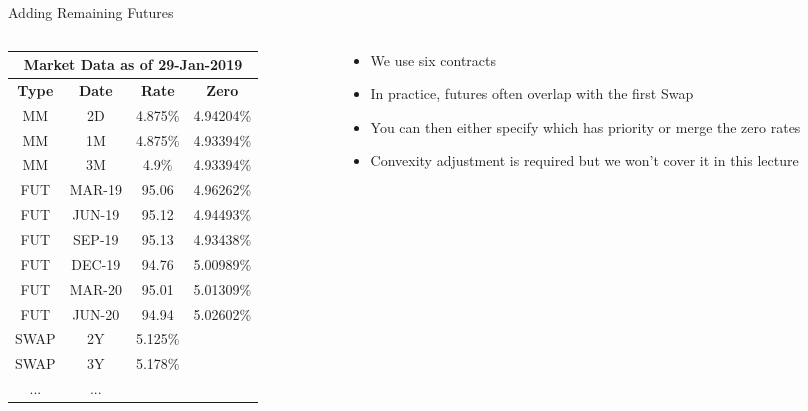 \documentclass[handout, aspectratio=169]{beamer}
\begin{document}
\begin{frame}{Adding Remaining Futures}
	\begin{columns}[T]
		\begin{column}{0.4\textwidth}
			\begin{table}[t]
				\centering
				\begin{adjustbox}{max width=\textwidth, max height=\textheight}
					\begin{tabular}{|c|c|c|c|} 
						\hline
						\multicolumn{4}{|c|}{\textbf{Market Data as of 29-Jan-2019}} \\
						\hline
						\textbf{Type} & \textbf{Date}  & \textbf{Rate} & \textbf{Zero}\\				
						\hline
						MM & 2D & 4.875\% & 4.94204\% \\
						MM & 1M & 4.875\% & 4.93394\% \\
						MM & 3M & 4.9\% & 4.93394\% \\
						\hline
						FUT & MAR-19 & 95.06 & 4.96262\% \\
						FUT & JUN-19 & 95.12 & 4.94493\% \\
						FUT & SEP-19 & 95.13 & 4.93438\% \\
						FUT & DEC-19 & 94.76 & 5.00989\% \\
						FUT & MAR-20 & 95.01 & 5.01309\% \\
						FUT & JUN-20 & 94.94 & 5.02602\% \\
						\hline
						SWAP & 2Y & 5.125\% &\\
						SWAP & 3Y & 5.178\% &\\
						... & ... & &\\
						\hline
					\end{tabular}
				\end{adjustbox}
			\end{table}
		\end{column}
		
		\begin{column}{0.7\textwidth}
			\begin{itemize}
				\item We use six contracts
				\item In practice, futures often overlap with the first Swap
				\item You can then either specify which has priority or merge the zero rates
				\item Convexity adjustment is required but we won't cover it in this lecture
			\end{itemize}
		 \end{column}
	\end{columns}
\end{frame}
\end{document}
